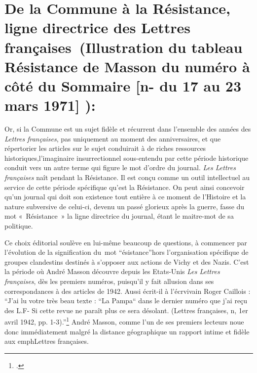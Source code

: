 \section{De la Commune à la Résistance, ligne directrice des Lettres françaises (Illustration du tableau Résistance de Masson du numéro à côté du Sommaire [n- du 17 au 23 mars 1971] ):}

Or, si la Commune est un sujet fidèle et récurrent dans l’ensemble des années des \emph{Lettres françaises}, pas uniquement au moment des anniversaires, et que répertorier les articles sur le sujet conduirait à de riches ressources historiques,l’imaginaire insurrectionnel sous-entendu par cette période historique conduit vers un autre terme qui figure le mot d’ordre du journal. \emph{Les Lettres françaises} naît pendant la Résistance. Il est conçu comme un outil intellectuel au service de cette période spécifique qu’est la Résistance. On peut ainsi concevoir qu’un journal qui doit son existence tout entière à ce moment de l’Histoire et la nature subversive de celui-ci, devenu un passé glorieux après la guerre, fasse du mot « Résistance » la ligne directrice du journal, étant le maitre-mot de sa politique. 


	Ce choix éditorial soulève en lui-même beaucoup de questions, à commencer par l’évolution de la signification du mot \enquote{ésistance}hors l’organisation spécifique de groupes clandestins destinés à s’opposer aux actions de Vichy et des Nazis. C’est la période où André Masson découvre depuis les Etats-Unis \emph{Les Lettres françaises}, dès les premiers numéros, puisqu’il y  fait allusion dans ses correspondances à des articles de 1942. Aussi écrit-il à l’écrvivain Roger Caillois : \enquote{J’ai lu votre très beau texte : “La Pampa“ dans le dernier numéro que j’ai reçu des L.F- Si cette revue ne paraît plus ce sera désolant. (Lettres françaises, n, 1er avril 1942, pp. 1-3).}\footcite[p482]{anneessurrealistes} André Masson, comme l’un de ses premiers lecteurs noue donc immédiatement malgré la distance géographique un rapport intime et fidèle aux emph{Lettres françaises}. 


